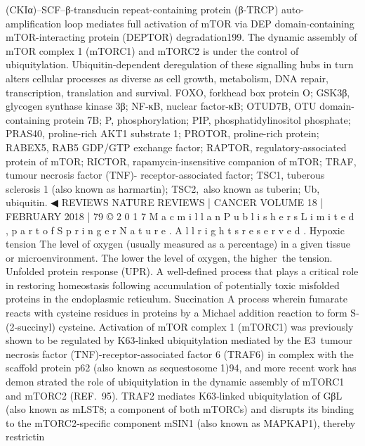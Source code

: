 (CKIα)–SCF–β-transducin repeat-containing protein (β-TRCP) auto-amplification loop
mediates full activation of mTOR via DEP domain-containing mTOR-interacting protein
(DEPTOR) degradation199. The dynamic assembly of mTOR complex 1 (mTORC1) and
mTORC2 is under the control of ubiquitylation. Ubiquitin-dependent deregulation of
these signalling hubs in turn alters cellular processes as diverse as cell growth,
metabolism, DNA repair, transcription, translation and survival. FOXO, forkhead box
protein O; GSK3β, glycogen synthase kinase 3β; NF‑κB, nuclear factor-κB; OTUD7B, OTU
domain-containing protein 7B; P, phosphorylation; PIP, phosphatidylinositol phosphate;
PRAS40, proline-rich AKT1 substrate 1; PROTOR, proline-rich protein; RABEX5, RAB5
GDP/GTP exchange factor; RAPTOR, regulatory-associated protein of mTOR; RICTOR,
rapamycin-insensitive companion of mTOR; TRAF, tumour necrosis factor (TNF)-
receptor-associated factor; TSC1, tuberous sclerosis 1 (also known as harmartin);
TSC2, also known as tuberin; Ub, ubiquitin.
◀
REVIEWS
NATURE REVIEWS | CANCER
 VOLUME 18 | FEBRUARY 2018 | 79
©
 2
0
1
7
 M
a
c
m
i
l
l
a
n
 P
u
b
l
i
s
h
e
r
s
 L
i
m
i
t
e
d
,
 p
a
r
t
 o
f
 S
p
r
i
n
g
e
r
 N
a
t
u
r
e
.
 A
l
l
 r
i
g
h
t
s
 r
e
s
e
r
v
e
d
.
Hypoxic tension
The level of oxygen (usually
measured as a percentage)
in a given tissue or
microenvironment. The lower
the level of oxygen, the
higher the tension.
Unfolded protein response
(UPR). A well-defined process
that plays a critical role in
restoring homeostasis following
accumulation of potentially
toxic misfolded proteins in the
endoplasmic reticulum.
Succination
A process wherein fumarate
reacts with cysteine residues in
proteins by a Michael addition
reaction to form S-(2‑succinyl)
cysteine.
Activation of mTOR complex 1 (mTORC1) was
previously shown to be regulated by K63‑linked
ubiquity­lation mediated by the E3 tumour necrosis
factor (TNF)-receptor-associated factor 6 (TRAF6) in
complex with the scaffold protein p62 (also known as
sequestosome 1)94, and more recent work has demon­
strated the role of ubiquitylation in the dynamic
assembly of mTORC1 and mTORC2 (REF. 95). TRAF2
mediates K63‑linked ubiquitylation of GβL (also known
as mLST8; a component of both mTORCs) and disrupts
its binding to the mTORC2‑specific component mSIN1
(also known as MAPKAP1), thereby restrictin

